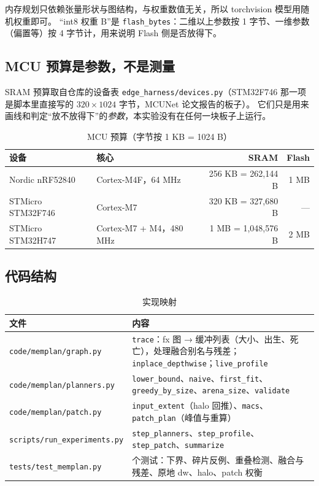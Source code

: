 \documentclass[11pt,a4paper]{ctexart}
\begin{document}
内存规划只依赖张量形状与图结构，与权重数值无关，所以 torchvision 模型用随机权重即可。
“int8 权重 B”是 \texttt{flash\_bytes}：二维以上参数按 1 字节、一维参数（偏置等）按 4 字节计，用来说明 Flash 侧是否放得下。

\subsection{MCU 预算是参数，不是测量}
SRAM 预算取自仓库的设备表 \texttt{edge\_harness/devices.py}（STM32F746 那一项是脚本里直接写的 $320\times1024$ 字节，MCUNet 论文报告的板子）。
它们只是用来画线和判定“放不放得下”的\emph{参数}，本实验没有在任何一块板子上运行。

\begin{table}[H]
\centering\small
\caption{MCU 预算（字节按 1 KB = 1024 B）}\label{tab:budgets}
\begin{tabular}{llrr}
\toprule
设备 & 核心 & SRAM & Flash \\
\midrule
Nordic nRF52840 & Cortex-M4F，64 MHz & 256 KB = 262,144 B & 1 MB \\
STMicro STM32F746 & Cortex-M7 & 320 KB = 327,680 B & — \\
STMicro STM32H747 & Cortex-M7 + M4，480 MHz & 1 MB = 1,048,576 B & 2 MB \\
\bottomrule
\end{tabular}
\end{table}

\subsection{代码结构}
\begin{table}[H]
\centering\small
\caption{实现映射}\label{tab:code}
\begin{tabularx}{\linewidth}{l >{\raggedright\arraybackslash}X}
\toprule
文件 & 内容 \\
\midrule
\texttt{code/memplan/graph.py} & \texttt{trace}：fx 图 → 缓冲列表（大小、出生、死亡），处理融合别名与残差；\texttt{inplace\_depthwise}；\texttt{live\_profile} \\
\texttt{code/memplan/planners.py} & \texttt{lower\_bound}、\texttt{naive}、\texttt{first\_fit}、\texttt{greedy\_by\_size}、\texttt{arena\_size}、\texttt{validate} \\
\texttt{code/memplan/patch.py} & \texttt{input\_extent}（halo 回推）、\texttt{macs}、\texttt{patch\_plan}（峰值与重算） \\
\texttt{scripts/run\_experiments.py} & \texttt{step\_planners}、\texttt{step\_profile}、\texttt{step\_patch}、\texttt{summarize} \\
\texttt{tests/test\_memplan.py} & 9 个测试：下界、碎片反例、重叠检测、融合与残差、原地 dw、halo、patch 权衡 \\
\bottomrule
\end{tabularx}
\end{table}
\end{document}
